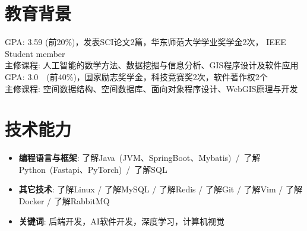 \documentclass{resume}
\begin{document}




\section{教育背景}
{\small GPA: 3.59 (前20\%)，发表SCI论文2篇，华东师范大学学业奖学金2次， IEEE Student member\\
  主修课程: 人工智能的数学方法、数据挖掘与信息分析、GIS程序设计及软件应用}
\vspace{0.1cm}
{\small GPA: 3.0~~(前40\%)，国家励志奖学金，科技竞赛奖2次，软件著作权2个\\
  主修课程: 空间数据结构、空间数据库、面向对象程序设计、WebGIS原理与开发}

\section{技术能力}
\begin{itemize}[parsep=0.2ex]

  \item \textbf{编程语言与框架}: 了解Java~(JVM、SpringBoot、Mybatis)~/~了解Python~(Fastapi、PyTorch)~/~了解SQL~
  \vspace{0.1cm}
  \item \textbf{其它技术}: 了解Linux / 了解MySQL / 了解Redis / 了解Git / 了解Vim / 了解Docker / 了解RabbitMQ
  \vspace{0.1cm}
  \item \textbf{关键词}: 后端开发，AI软件开发，深度学习，计算机视觉

\end{itemize}
\end{document}
